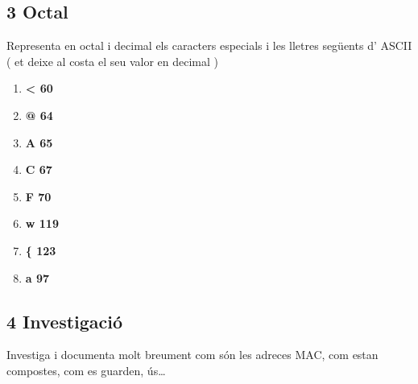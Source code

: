 \documentclass[
  12 pt,
  a4paper,
]{article}
\providecommand{\tightlist}{%
  \setlength{\itemsep}{0pt}\setlength{\parskip}{0pt}}
\begin{document}
\subsection{3 Octal}\label{octal}

Representa en octal i decimal els caracters especials i les lletres
següents d' ASCII ( et deixe al costa el seu valor en decimal )

\begin{enumerate}
\def\labelenumi{\arabic{enumi}.}
\tightlist
\item
  \textbf{\textless{} 60}
\item
  \textbf{@ 64}
\item
  \textbf{A 65}
\item
  \textbf{C 67}
\item
  \textbf{F 70}
\item
  \textbf{w 119}
\item
  \textbf{\{ 123}
\item
  \textbf{a 97}
\end{enumerate}

\subsection{4 Investigació}\label{investigaciuxf3}

Investiga i documenta molt breument com són les adreces MAC, com estan
compostes, com es guarden, ús\ldots{}
\end{document}
